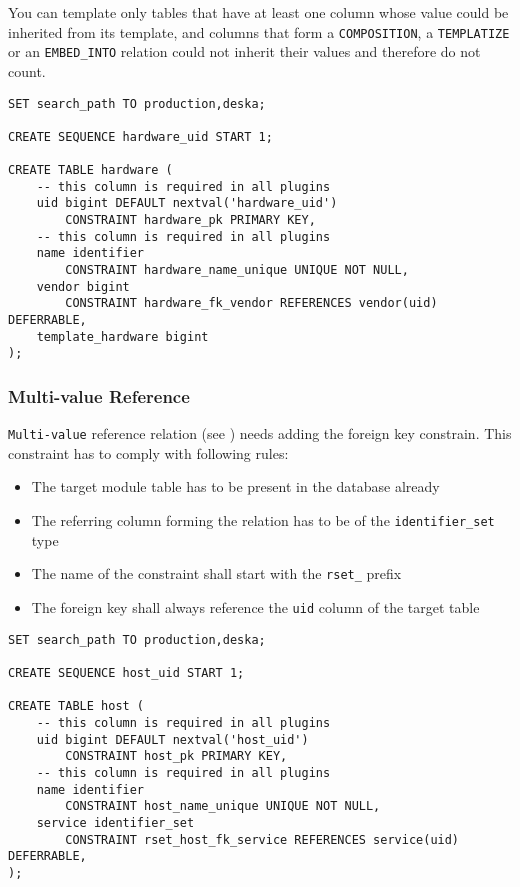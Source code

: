 \documentclass[deska]{subfiles}
\begin{document}
You can template only tables that have at least one column whose value could be inherited from its template, and columns
that form a {\tt COMPOSITION}, a {\tt TEMPLATIZE} or an {\tt EMBED\_INTO} relation could not inherit their values and
therefore do not count.

\begin{verbatim}
SET search_path TO production,deska;

CREATE SEQUENCE hardware_uid START 1;

CREATE TABLE hardware (
    -- this column is required in all plugins
    uid bigint DEFAULT nextval('hardware_uid')
        CONSTRAINT hardware_pk PRIMARY KEY,
    -- this column is required in all plugins
    name identifier
        CONSTRAINT hardware_name_unique UNIQUE NOT NULL,
    vendor bigint 
        CONSTRAINT hardware_fk_vendor REFERENCES vendor(uid) DEFERRABLE,
    template_hardware bigint
);
\end{verbatim}


\subsubsection{Multi-value Reference}
{\tt Multi-value} reference relation (see ) needs adding the foreign key constrain. This constraint has to comply with following rules:
\begin{itemize}
    \item The target module table has to be present in the database already
    \item The referring column forming the relation has to be of the {\tt identifier\_set} type
    \item The name of the constraint shall start with the {\tt rset\_} prefix
    \item The foreign key shall always reference the {\tt uid} column of the target table
\end{itemize}

\begin{verbatim}
SET search_path TO production,deska;

CREATE SEQUENCE host_uid START 1;

CREATE TABLE host (
    -- this column is required in all plugins
    uid bigint DEFAULT nextval('host_uid')
        CONSTRAINT host_pk PRIMARY KEY,
    -- this column is required in all plugins
    name identifier
        CONSTRAINT host_name_unique UNIQUE NOT NULL,
    service identifier_set
        CONSTRAINT rset_host_fk_service REFERENCES service(uid) DEFERRABLE,
);
\end{verbatim}
\end{document}
